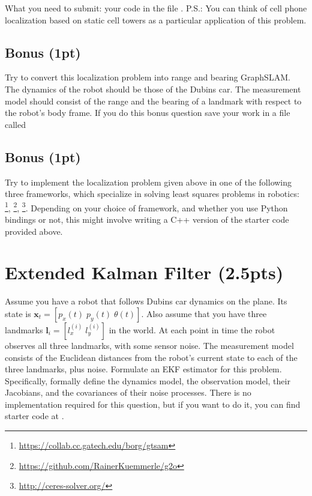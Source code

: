 \documentclass[a4paper,10pt]{article}
\begin{document}
\noindent What you need to submit: your code in the file .
\newline
\newline
P.S.: You can think of cell phone localization based on static cell towers as a particular application of this problem.  

\subsection{Bonus (1pt)}
Try to convert this localization problem into range and bearing GraphSLAM. The dynamics of the robot should be those of the Dubins car. 
The measurement model should consist of the range and the bearing of a landmark with respect to the robot's body frame. If you do
this bonus question save your work in a file called  

\subsection{Bonus (1pt)}
Try to implement the localization problem given above in one of the following three frameworks, which specialize in solving least squares
problems in robotics: \footnote{\url{https://collab.cc.gatech.edu/borg/gtsam}}, \footnote{\url{https://github.com/RainerKuemmerle/g2o}}, \footnote{\url{http://ceres-solver.org/}}. 
Depending on your choice of framework, and whether you use Python bindings or not, this might involve writing a C++ version of the starter code provided above.


\section{Extended Kalman Filter (2.5pts)}
Assume you have a robot that follows Dubins car dynamics on the plane. Its state is $\textbf{x}_t=[p_x(t) \; p_y(t) \; \theta(t)]$. Also assume that you have
three landmarks $\textbf{l}_i=[l_x^{(i)} \; l_y^{(i)}]$ in the world. At each point in time the robot observes all three landmarks, with some sensor noise.
The measurement model consists of the Euclidean distances from the robot's current state to each of the three landmarks, plus noise. Formulate an EKF estimator for this problem.
Specifically, formally define the dynamics model, the observation model, their Jacobians, and the covariances of their noise processes. There is no implementation
required for this question, but if you want to do it, you can find starter code at . 
\end{document}
